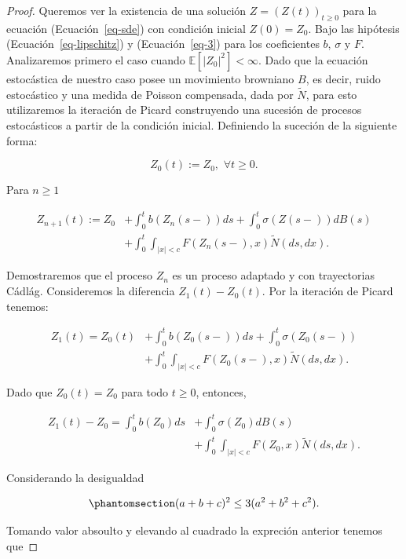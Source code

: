 \documentclass[
  spanish,
  us-letterpaper,
]{scrreprt}
\theoremstyle{plain}
\theoremstyle{plain}
\theoremstyle{plain}
\theoremstyle{definition}
\theoremstyle{remark}
\begin{document}
\begin{proof}
Queremos ver la existencia de una solución \(Z=(Z(t))_{t\geq 0}\) para
la ecuación (Ecuación~\ref{eq-sde}) con condición inicial \(Z(0)=Z_0\).
Bajo las hipótesis (Ecuación~\ref{eq-lipschitz}) y (Ecuación~\ref{eq-3})
para los coeficientes \(b\), \(\sigma\) y \(F\). Analizaremos primero el
caso cuando \(\mathbb{E}[|Z_0|^2]<\infty\). Dado que la ecuación
estocástica de nuestro caso posee un movimiento browniano \(B\), es
decir, ruido estocástico y una medida de Poisson compensada, dada por
\(\widetilde{N}\), para esto utilizaremos la iteración de Picard
construyendo una sucesión de procesos estocásticos a partir de la
condición inicial. Definiendo la suceción de la siguiente forma:

\[
    Z_0(t) :=Z_0, \, \, \forall t\geq 0.
\]

Para \(n\geq 1\)

\[
    \begin{aligned}
        Z_{n+1}(t) := Z_0 & +\int _0^t b(Z_n(s-))ds+\int_0^t \sigma(Z(s-))dB(s)\\ 
        & + \int_0^t \int _{|x|<c} F(Z_n(s-),x)\widetilde{N}(ds,dx).
    \end{aligned}
\]

Demostraremos que el proceso \(Z_n\) es un proceso adaptado y con
trayectorias Cádlág. Consideremos la diferencia \(Z_1(t)-Z_0(t)\). Por
la iteración de Picard tenemos:

\[
    \begin{aligned}
        Z_1(t) = Z_0(t) & + \int_0^t b(Z_0(s-))ds +\int_0^t\sigma(Z_0(s-))\\ 
        & +\int_0^t \int_{|x|<c} F(Z_0(s-),x)\widetilde{N}(ds,dx).
    \end{aligned}
\]

Dado que \(Z_0(t)=Z_0\) para todo \(t\geq 0\), entonces,

\[
    \begin{aligned}
        Z_1(t)-Z_0 = \int_0^t b(Z_0) ds & + \int_0^t \sigma(Z_0)dB(s)\\ 
        & + \int_0^t\int_{|x|<c} F(Z_0,x)\widetilde{N}(ds,dx). 
    \end{aligned}
\]

Considerando la desigualdad

\begin{equation}\phantomsection\label{eq-des}{
(a+b+c)^2\leq 3(a^2+b^2+c^2).
}\end{equation}

Tomando valor absoulto y elevando al cuadrado la expreción anterior
tenemos que


\end{proof}
\end{document}
